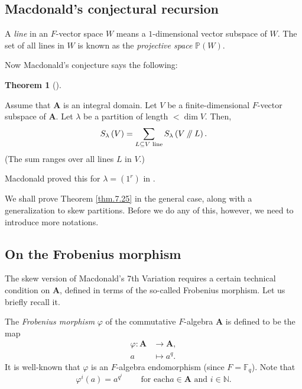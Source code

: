 \documentclass[numbers=enddot,12pt,final,onecolumn,notitlepage]{scrartcl}%
\numberwithin{exer}{section}
\theoremstyle{definition}
\newtheorem{theo}{Theorem}[section]
\newenvironment{theorem}[1][]
{\begin{theo}[#1]\begin{leftbar}}
{\end{leftbar}\end{theo}}
\let\sumnonlimits\sum
\renewcommand{\sum}{\sumnonlimits\limits}
\newcommand{\sslash}{\mathbin{/\mkern-5mu/}}
\theoremstyle{plainsl}
\begin{document}
\subsection{Macdonald's conjectural recursion}

A \emph{line} in an $F$-vector space $W$ means a $1$-dimensional vector
subspace of $W$. The set of all lines in $W$ is known as the \emph{projective
space} $\mathbb{P}\left(  W\right)  $.

Now Macdonald's conjecture \cite[(7.25 ?)]{Macdon92} says the following:

\begin{theorem}
\label{thm.7.25}Assume that $\mathbf{A}$ is an integral domain. Let $V$ be a
finite-dimensional $F$-vector subspace of $\mathbf{A}$. Let $\lambda$ be a
partition of length $<\dim V$. Then,%
\[
S_{\lambda}\left(  V\right)  =\sum_{L\subseteq V\text{ line}}S_{\lambda
}\left(  V\sslash L\right)  .
\]
(The sum ranges over all lines $L$ in $V$.)
\end{theorem}

Macdonald proved this for $\lambda=\left(  1^{r}\right)  $ in \cite[\S I.2,
Example 26 (d)]{Macdon95}.

We shall prove Theorem \ref{thm.7.25} in the general case, along with a
generalization to skew partitions. Before we do any of this, however, we need
to introduce more notations.

\subsection{On the Frobenius morphism}

The skew version of Macdonald's 7th Variation requires a certain technical
condition on $\mathbf{A}$, defined in terms of the so-called Frobenius
morphism. Let us briefly recall it.

The \emph{Frobenius morphism} $\varphi$ of the commutative $F$-algebra
$\mathbf{A}$ is defined to be the map%
\begin{align*}
\varphi:\mathbf{A}  &  \rightarrow\mathbf{A},\\
a  &  \mapsto a^{q}.
\end{align*}
It is well-known that $\varphi$ is an $F$-algebra endomorphism (since
$F=\mathbb{F}_{q}$). Note that%
\begin{equation}
\varphi^{i}\left(  a\right)  =a^{q^{i}}\ \ \ \ \ \ \ \ \ \ \text{for each
}a\in\mathbf{A}\text{ and }i\in\mathbb{N}. \label{eq.phiia}%
\end{equation}
\end{document}
